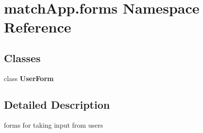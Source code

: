 \section{match\+App.\+forms Namespace Reference}
\label{namespacematch_app_1_1forms}
\subsection*{Classes}
\begin{DoxyCompactItemize}
\item 
class {\bf User\+Form}
\end{DoxyCompactItemize}


\subsection{Detailed Description}
\begin{DoxyVerb}forms for taking input from users\end{DoxyVerb}
 